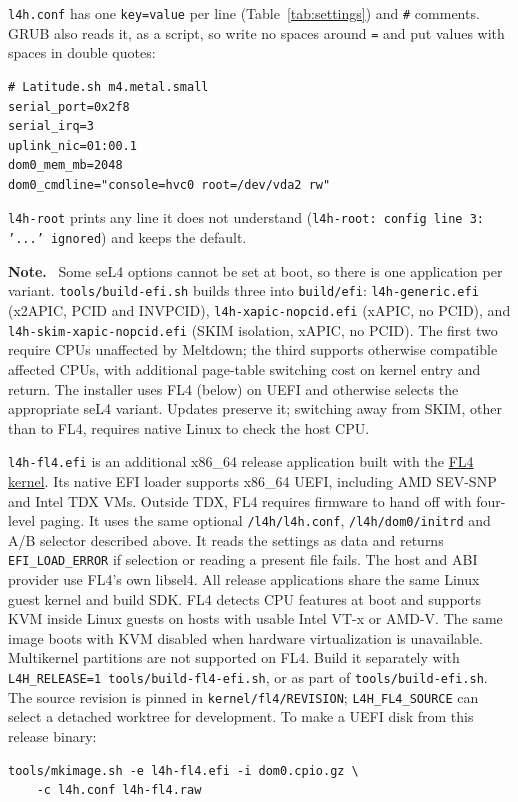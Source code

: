 \documentclass[11pt,a4paper]{report}
\newcommand{\cmd}[1]{\texttt{#1}}
\newcommand{\file}[1]{\texttt{#1}}
\newenvironment{caveat}{\par\medskip\noindent\color{note}\textbf{Note.}\ }{\par\medskip}
\begin{document}
\file{l4h.conf} has one \texttt{key=value} per line (Table~\ref{tab:settings})
and \texttt{\#} comments. GRUB also reads it, as a script, so write no
spaces around \texttt{=} and put values with spaces in double quotes:
\begin{lstlisting}
# Latitude.sh m4.metal.small
serial_port=0x2f8
serial_irq=3
uplink_nic=01:00.1
dom0_mem_mb=2048
dom0_cmdline="console=hvc0 root=/dev/vda2 rw"
\end{lstlisting}
\texttt{l4h-root} prints any line it does not understand
(\texttt{l4h-root: config line 3: '...' ignored}) and keeps the default.

\begin{caveat}
Some seL4 options cannot be set at boot, so there is one application per
variant. \cmd{tools/build-efi.sh} builds three into \file{build/efi}:
\file{l4h-generic.efi} (x2APIC, PCID and INVPCID),
\file{l4h-xapic-nopcid.efi} (xAPIC, no PCID), and
\file{l4h-skim-xapic-nopcid.efi} (SKIM isolation, xAPIC, no PCID).
The first two require CPUs unaffected by Meltdown; the third supports
otherwise compatible affected CPUs, with additional page-table switching
cost on kernel entry and return. The installer uses FL4 (below) on UEFI
and otherwise selects the appropriate seL4 variant. Updates preserve it; switching away from SKIM, other than to
FL4, requires native Linux to check the host CPU.
\end{caveat}

\file{l4h-fl4.efi} is an additional x86\_64 release application built with
the \href{https://github.com/losfair/FL4}{FL4 kernel}. Its native EFI loader
supports x86\_64 UEFI, including AMD SEV-SNP and Intel TDX VMs.
Outside TDX, FL4 requires firmware to hand off with four-level paging.
It uses the same optional \file{/l4h/l4h.conf}, \file{/l4h/dom0/initrd}
and A/B selector described above. It reads the settings as data and returns
\texttt{EFI\_LOAD\_ERROR} if selection or reading a present file fails.
The host and ABI provider use FL4's own libsel4. All release applications share
the same Linux guest kernel and build SDK. FL4 detects
CPU features at boot and supports KVM inside Linux guests on hosts with
usable Intel VT-x or AMD-V. The same image boots with KVM disabled when
hardware virtualization is unavailable. Multikernel partitions are not
supported on FL4.
Build it separately with \cmd{L4H\_RELEASE=1 tools/build-fl4-efi.sh}, or
as part of \cmd{tools/build-efi.sh}. The source revision is pinned in
\file{kernel/fl4/REVISION}; \texttt{L4H\_FL4\_SOURCE} can select a detached
worktree for development. To make a UEFI disk from this release binary:
\begin{lstlisting}
tools/mkimage.sh -e l4h-fl4.efi -i dom0.cpio.gz \
    -c l4h.conf l4h-fl4.raw
\end{lstlisting}
\end{document}
